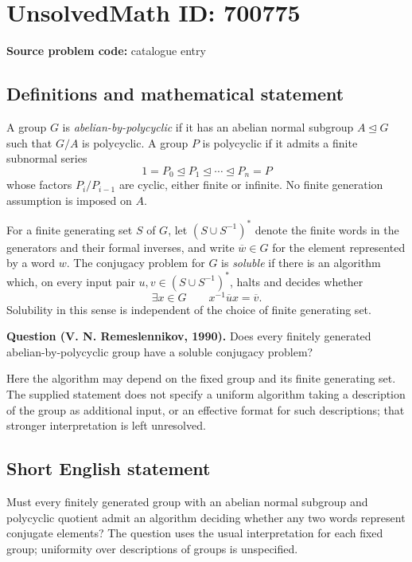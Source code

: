 \documentclass[11pt]{article}
\begin{document}
\section*{UnsolvedMath ID: 700775}
\textbf{Source problem code:} catalogue entry
\subsection{Definitions and mathematical statement}
A group \(G\) is \emph{abelian-by-polycyclic} if it has an abelian normal subgroup \(A\trianglelefteq G\) such that \(G/A\) is polycyclic. A group \(P\) is polycyclic if it admits a finite subnormal series
\[
1=P_0\trianglelefteq P_1\trianglelefteq\cdots\trianglelefteq P_n=P
\]
whose factors \(P_i/P_{i-1}\) are cyclic, either finite or infinite. No finite generation assumption is imposed on \(A\).

For a finite generating set \(S\) of \(G\), let \((S\cup S^{-1})^*\) denote the finite words in the generators and their formal inverses, and write \(\overline{w}\in G\) for the element represented by a word \(w\). The conjugacy problem for \(G\) is \emph{soluble} if there is an algorithm which, on every input pair \(u,v\in(S\cup S^{-1})^*\), halts and decides whether
\[
\exists x\in G\qquad x^{-1}\overline{u}x=\overline{v}.
\]
Solubility in this sense is independent of the choice of finite generating set.

\textbf{Question (V. N. Remeslennikov, 1990).} Does every finitely generated abelian-by-polycyclic group have a soluble conjugacy problem?

Here the algorithm may depend on the fixed group and its finite generating set. The supplied statement does not specify a uniform algorithm taking a description of the group as additional input, or an effective format for such descriptions; that stronger interpretation is left unresolved.
\subsection{Short English statement}
Must every finitely generated group with an abelian normal subgroup and polycyclic quotient admit an algorithm deciding whether any two words represent conjugate elements? The question uses the usual interpretation for each fixed group; uniformity over descriptions of groups is unspecified.
\end{document}
